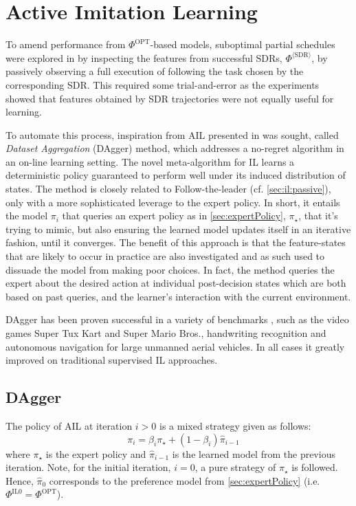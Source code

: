 \documentclass[twocolumn]{svjour3}
\begin{document}
\section{Active Imitation Learning}\label{sec:il:active}

To amend performance from $\Phi^{\text{OPT}}$-based models, suboptimal 
partial schedules were explored in \cite{InRu15a} by inspecting the features 
from successful SDRs, $\Phi^{\langle\text{SDR}\rangle}$, by passively observing 
a full execution of following the task chosen by the corresponding SDR. 
This required some trial-and-error as the experiments showed that features 
obtained by SDR trajectories were not equally useful for learning.

To automate this process, inspiration from AIL presented in \cite{RossGB11} was 
sought, called \emph{Dataset Aggregation} (DAgger) method, which addresses a 
no-regret algorithm in an on-line learning setting. 
The novel meta-algorithm for IL learns a deterministic policy guaranteed to 
perform well under its induced distribution of states. 
The method is closely related to Follow-the-leader (cf. 
\cref{sec:il:passive}), only with a more sophisticated leverage to the 
expert policy. 
In short, it entails the model $\pi_i$ that queries an expert policy as 
in \cref{sec:expertPolicy}, $\pi_\star$, that it's trying to mimic, 
but also ensuring the learned model updates itself in an iterative fashion, 
until it converges. 
The benefit of this approach is that the feature-states that are likely to 
occur in practice are also investigated and as such used to dissuade the model 
from making poor choices. In fact, the method queries the expert about the 
desired action at individual post-decision states which are both based on past 
queries, and the learner's interaction with the current environment.

DAgger has been proven successful in a variety of benchmarks 
\cite{RossGB11,Ross13}, such as the video games Super Tux Kart and Super 
Mario Bros., handwriting recognition and autonomous navigation for large 
unmanned aerial vehicles. In all cases it greatly improved on traditional 
supervised IL approaches.

\subsection{DAgger}
The policy of AIL at iteration $i>0$ is a mixed strategy given as follows:
\begin{equation}\quad\label{eq:il}
\pi_i = \beta_i\pi_\star + (1-\beta_i)\hat{\pi}_{i-1}
\end{equation}
where $\pi_\star$ is the expert policy and $\hat{\pi}_{i-1}$ is the learned 
model from the previous iteration. 
Note, for the initial iteration, $i=0$, a pure strategy of $\pi_\star$ is 
followed. Hence, $\hat{\pi}_0$ corresponds to the preference model from 
\cref{sec:expertPolicy} (i.e. $\Phi^{\text{IL}0}=\Phi^{\text{OPT}}$). 
\end{document}
